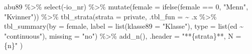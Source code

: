 \documentclass[
  norsk,
  letterpaper,
  DIV=11,
  numbers=noendperiod]{scrreprt}
\newenvironment{Shaded}{\begin{snugshade}}{\end{snugshade}}
\newcommand{\AttributeTok}[1]{\textcolor[rgb]{0.40,0.45,0.13}{#1}}
\newcommand{\DecValTok}[1]{\textcolor[rgb]{0.68,0.00,0.00}{#1}}
\newcommand{\FunctionTok}[1]{\textcolor[rgb]{0.28,0.35,0.67}{#1}}
\newcommand{\NormalTok}[1]{\textcolor[rgb]{0.00,0.23,0.31}{#1}}
\newcommand{\SpecialCharTok}[1]{\textcolor[rgb]{0.37,0.37,0.37}{#1}}
\newcommand{\StringTok}[1]{\textcolor[rgb]{0.13,0.47,0.30}{#1}}
\theoremstyle{definition}
\theoremstyle{remark}
\begin{document}
\begin{Shaded}
\begin{Highlighting}[]
\NormalTok{abu89 }\SpecialCharTok{\%\textgreater{}\%} 
  \FunctionTok{select}\NormalTok{(}\SpecialCharTok{{-}}\NormalTok{io\_nr) }\SpecialCharTok{\%\textgreater{}\%} 
  \FunctionTok{mutate}\NormalTok{(}\AttributeTok{female =} \FunctionTok{ifelse}\NormalTok{(female }\SpecialCharTok{==} \DecValTok{0}\NormalTok{, }\StringTok{"Menn"}\NormalTok{, }\StringTok{"Kvinner"}\NormalTok{)) }\SpecialCharTok{\%\textgreater{}\%} 
  \FunctionTok{tbl\_strata}\NormalTok{(}\AttributeTok{strata =}\NormalTok{ private, }
             \AttributeTok{.tbl\_fun =} 
               \SpecialCharTok{\textasciitilde{}}\NormalTok{ .x }\SpecialCharTok{\%\textgreater{}\%}
               \FunctionTok{tbl\_summary}\NormalTok{(}\AttributeTok{by =}\NormalTok{ female, }
              \AttributeTok{label =} \FunctionTok{list}\NormalTok{(}\AttributeTok{klasse89 =} \StringTok{"Klasse"}\NormalTok{), }
              \AttributeTok{type =} \FunctionTok{list}\NormalTok{(ed }\SpecialCharTok{\textasciitilde{}} \StringTok{"continuous"}\NormalTok{), }
              \AttributeTok{missing =} \StringTok{"no"}\NormalTok{) }\SpecialCharTok{\%\textgreater{}\%}
               \FunctionTok{add\_n}\NormalTok{(),}
    \AttributeTok{.header =} \StringTok{"**\{strata\}**, N = \{n\}"}
\NormalTok{    )}
\end{Highlighting}
\end{Shaded}
\end{document}
